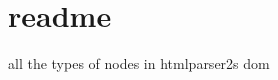 \chapter{readme}
\hypertarget{md_node__modules_2svgo_2node__modules_2domutils_2node__modules_2domelementtype_2readme}{}\label{md_node__modules_2svgo_2node__modules_2domutils_2node__modules_2domelementtype_2readme}
all the types of nodes in htmlparser2\textquotesingle{}s dom 
